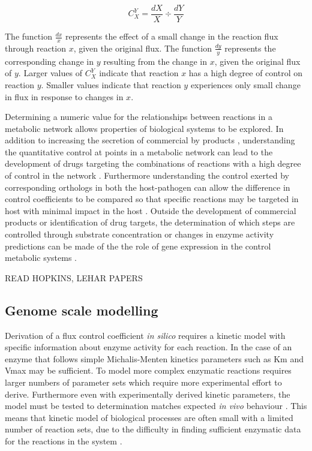 \begin{equation}\label{fcc}
C_{X}^{Y} = \frac{dX}{X}\div\frac{dY}{Y}
\end{equation}

The function $\frac{dx}{x}$ represents the effect of a small change in the reaction flux through reaction $x$, given the original flux. The function $\frac{dy}{y}$ represents the corresponding change in $y$ resulting from the change in $x$, given the original flux of $y$. Larger values of $C_{X}^{Y}$ indicate that reaction $x$ has a high degree of control on reaction $y$. Smaller values indicate that reaction $y$ experiences only small change in flux in response to changes in $x$.

Determining a numeric value for the relationships between reactions in a metabolic network allows properties of biological systems to be explored. In addition to increasing the secretion of commercial by products \cite{niederberger1992}, understanding the quantitative control at points in a metabolic network can lead to the development of drugs targeting the combinations of reactions with a high degree of control in the network \cite{lehar2008,hopkins2008}. Furthermore understanding the control exerted by corresponding orthologs in both the host-pathogen can allow the difference in control coefficients to be compared so that specific reactions may be targeted in host with minimal impact in the host \cite{hornberg2007}. Outside the development of commercial products or identification of drug targets, the determination of which steps are controlled through substrate concentration or changes in enzyme activity predictions can be made of the the role of gene expression in the control metabolic systems \cite{rossell2006,daran-lapujade2007}.

READ HOPKINS, LEHAR PAPERS

\subsection{Genome scale modelling}

Derivation of a flux control coefficient \emph{in silico} requires a kinetic model with specific information about enzyme activity for each reaction. In the case of an enzyme that follows simple Michalis-Menten kinetics parameters such as Km and Vmax may be sufficient. To model more complex enzymatic reactions requires larger numbers of parameter sets which require more experimental effort to derive. Furthermore even with experimentally derived kinetic parameters, the model must be tested to determination matches expected \emph{in vivo} behaviour \cite{teusink2000}. This means that kinetic model of biological processes are often small with a limited number of reaction sets, due to the difficulty in finding sufficient enzymatic data for the reactions in the system \cite{steuer2007}.

